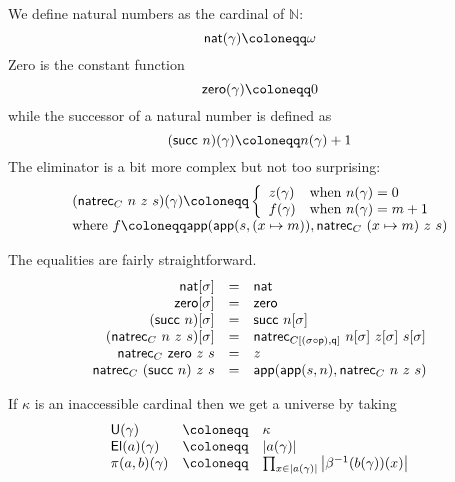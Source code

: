 
We define natural numbers as the cardinal of \(\mathbb{N}\):
\[
  \nat(\gamma) \coloneqq \omega
\]
Zero is the constant function
\[
  \czero(\gamma) \coloneqq 0
\]
while the successor of a natural number is defined as
\[
  (\csucc\ n)(\gamma) \coloneqq n(\gamma) + 1
\]
The eliminator is a bit more complex but not too surprising:
\[
  \begin{array}{l}
    (\natrec_C\ n\ z\ s)(\gamma) \coloneqq
    \left\{
    \begin{array}{ll}
      z(\gamma) & \text{when \(n(\gamma) = 0\)} \\
      f(\gamma) &
      \text{when \(n(\gamma) = m + 1\)}
    \end{array}
    \right. \\
    \text{where } f \coloneqq
    \capp(\capp(s, (x \mapsto m)), \natrec_C\ (x \mapsto m)\ z\ s)
  \end{array}
\]

The equalities are fairly straightforward.
\[
  \begin{array}{rcl}
    \nat[\sigma] &=& \nat \\
    \czero[\sigma] &=& \czero \\
    (\csucc\ n)[\sigma] &=& \csucc\ n[\sigma] \\
    (\natrec_C\ n\ z\ s)[\sigma] &=&
    \natrec_{C[(\sigma \circ \pp), \pq]}\ n[\sigma]\ z[\sigma]\ s[\sigma] \\
    \natrec_C\ \czero\ z\ s &=& z \\
    \natrec_C\ (\csucc\ n)\ z\ s &=& \capp(\capp(s,n), \natrec_C\ n\ z\ s)
  \end{array}
\]


If \(\kappa\) is an inaccessible cardinal then we get a universe by taking
\[
  \begin{array}{lcl}
    \CU(\gamma) &\coloneqq& \kappa \\
    \CEl(a)(\gamma) &\coloneqq& \card{a(\gamma)} \\
    \pi(a,b)(\gamma) &\coloneqq&
    \prod_{x \in \card{a(\gamma)}} \card{\beta^{-1}(b(\gamma))(x)}
  \end{array}
\]

